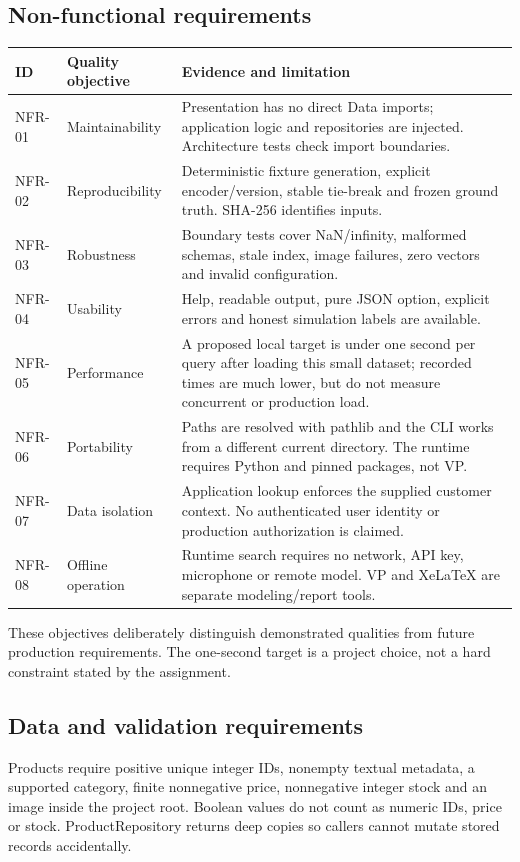 \documentclass[11pt,a4paper]{article}
\begin{document}
\subsection{Non-functional requirements}
\begin{longtable}{@{}P{1.35cm}P{3.5cm}P{10.55cm}@{}}
\toprule\textbf{ID}&\textbf{Quality objective}&\textbf{Evidence and limitation}\\\midrule\endhead
NFR-01&Maintainability&Presentation has no direct Data imports; application logic and repositories are injected. Architecture tests check import boundaries.\\
NFR-02&Reproducibility&Deterministic fixture generation, explicit encoder/version, stable tie-break and frozen ground truth. SHA-256 identifies inputs.\\
NFR-03&Robustness&Boundary tests cover NaN/infinity, malformed schemas, stale index, image failures, zero vectors and invalid configuration.\\
NFR-04&Usability&Help, readable output, pure JSON option, explicit errors and honest simulation labels are available.\\
NFR-05&Performance&A proposed local target is under one second per query after loading this small dataset; recorded times are much lower, but do not measure concurrent or production load.\\
NFR-06&Portability&Paths are resolved with pathlib and the CLI works from a different current directory. The runtime requires Python and pinned packages, not VP.\\
NFR-07&Data isolation&Application lookup enforces the supplied customer context. No authenticated user identity or production authorization is claimed.\\
NFR-08&Offline operation&Runtime search requires no network, API key, microphone or remote model. VP and XeLaTeX are separate modeling/report tools.\\\bottomrule
\end{longtable}
These objectives deliberately distinguish demonstrated qualities from future production requirements. The one-second target is a project choice, not a hard constraint stated by the assignment.

\subsection{Data and validation requirements}
Products require positive unique integer IDs, nonempty textual metadata, a supported category, finite nonnegative price, nonnegative integer stock and an image inside the project root. Boolean values do not count as numeric IDs, price or stock. ProductRepository returns deep copies so callers cannot mutate stored records accidentally.
\end{document}
